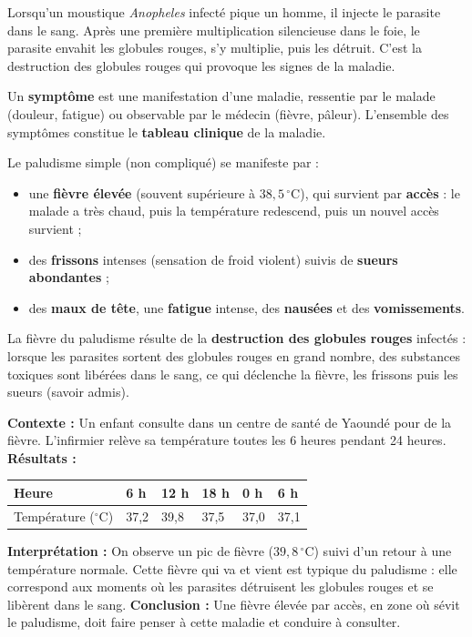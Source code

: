 \documentclass[11pt]{article}
\newcommand{\cle}[1]{{\popxbold\color{popdark}#1}}
\newcounter{popsec}
\newcounter{popsub}
\newcommand{\courssub}[1]{%
  \stepcounter{popsub}%
  \par\vspace{9pt}\noindent{\popxbold\fontsize{11.5}{13}\selectfont\color{popink}{\color{poporange}\thepopsec.\thepopsub}\hspace{6pt}#1}\par\nopagebreak\vspace{4pt}
}
\begin{document}
\courssub{Les manifestations du paludisme}

Lorsqu'un moustique \emph{Anopheles} infecté pique un homme, il injecte le parasite dans le sang. Après une première multiplication silencieuse dans le foie, le parasite envahit les \cle{globules rouges}, s'y multiplie, puis les détruit. C'est la destruction des globules rouges qui provoque les signes de la maladie.

\begin{definition}[Symptôme]
Un \textbf{symptôme} est une manifestation d'une maladie, ressentie par le malade (douleur, fatigue) ou observable par le médecin (fièvre, pâleur). L'ensemble des symptômes constitue le \textbf{tableau clinique} de la maladie.
\end{definition}

Le paludisme simple (non compliqué) se manifeste par :
\begin{itemize}
    \item une \textbf{fièvre élevée} (souvent supérieure à $38,5\,^\circ\mathrm{C}$), qui survient par \textbf{accès} : le malade a très chaud, puis la température redescend, puis un nouvel accès survient ;
    \item des \textbf{frissons} intenses (sensation de froid violent) suivis de \textbf{sueurs abondantes} ;
    \item des \textbf{maux de tête}, une \textbf{fatigue} intense, des \textbf{nausées} et des \textbf{vomissements}.
\end{itemize}

\begin{propriete}
La fièvre du paludisme résulte de la \textbf{destruction des globules rouges} infectés : lorsque les parasites sortent des globules rouges en grand nombre, des substances toxiques sont libérées dans le sang, ce qui déclenche la fièvre, les frissons puis les sueurs (savoir admis).
\end{propriete}

\begin{experience}
\textbf{Contexte :} Un enfant consulte dans un centre de santé de Yaoundé pour de la fièvre. L'infirmier relève sa température toutes les 6 heures pendant 24 heures.
\textbf{Résultats :}
\begin{center}
\begin{tabularx}{\linewidth}{|l|X|X|X|X|X|}\hline
Heure & 6 h & 12 h & 18 h & 0 h & 6 h \\ \hline
Température ($^\circ\mathrm{C}$) & 37,2 & 39,8 & 37,5 & 37,0 & 37,1 \\ \hline
\end{tabularx}
\end{center}
\textbf{Interprétation :} On observe un pic de fièvre ($39,8\,^\circ\mathrm{C}$) suivi d'un retour à une température normale. Cette fièvre qui va et vient est typique du paludisme : elle correspond aux moments où les parasites détruisent les globules rouges et se libèrent dans le sang.
\textbf{Conclusion :} Une fièvre élevée par accès, en zone où sévit le paludisme, doit faire penser à cette maladie et conduire à consulter.
\end{experience}
\end{document}
